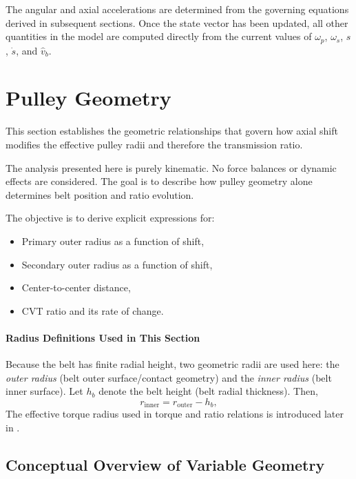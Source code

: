 \documentclass[11pt]{article}
\numberwithin{equation}{section}
\begin{document}
The angular and axial accelerations are determined from the governing 
equations derived in subsequent sections. Once the state vector has been 
updated, all other quantities in the model are computed directly from the 
current values of $\omega_p$, $\omega_s$, $s$, $\dot{s}$, and $\hat{v}_b$.


\section{Pulley Geometry}\label{sec:geometry}

This section establishes the geometric relationships that govern how axial
shift modifies the effective pulley radii and therefore the transmission ratio.

The analysis presented here is purely kinematic. No force balances or
dynamic effects are considered. The goal is to describe how pulley
geometry alone determines belt position and ratio evolution.

The objective is to derive explicit expressions for:

\begin{itemize}
    \item Primary outer radius as a function of shift,
    \item Secondary outer radius as a function of shift,
    \item Center-to-center distance,
    \item CVT ratio and its rate of change.
\end{itemize}

\paragraph{Radius Definitions Used in This Section}
Because the belt has finite radial height, two geometric radii are used here:
the \emph{outer radius} (belt outer surface/contact geometry) and the
\emph{inner radius} (belt inner surface). Let $h_b$ denote the belt height
(belt radial thickness). Then,
\[
r_{\text{inner}} = r_{\text{outer}} - h_b,
\]
The effective torque radius used in torque and ratio relations is introduced
later in .

\subsection{Conceptual Overview of Variable Geometry}
\end{document}
